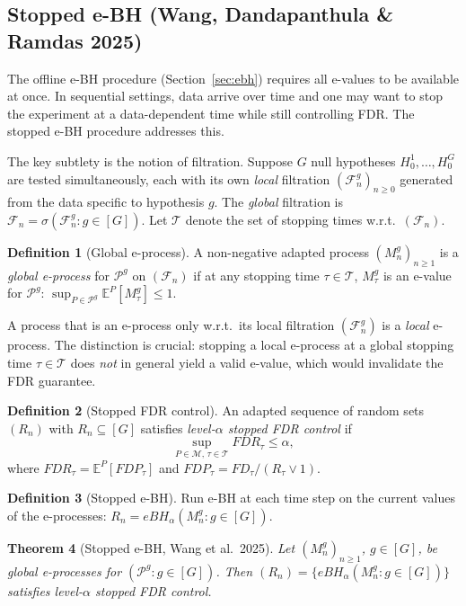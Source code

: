 \documentclass[11pt,a4paper,twocolumn]{article}
\theoremstyle{plain}
\newtheorem{theorem}{Theorem}[section]
\theoremstyle{definition}
\newtheorem{definition}[theorem]{Definition}
\theoremstyle{remark}
\newcommand{\E}{\mathbb{E}}
\begin{document}
\subsection{Stopped e-BH (Wang, Dandapanthula \& Ramdas 2025)}
\label{sec:stopped}

The offline e-BH procedure (Section~\ref{sec:ebh}) requires all e-values to
be available at once. In sequential settings, data arrive over time and one
may want to stop the experiment at a data-dependent time while still
controlling FDR. The stopped e-BH procedure addresses this.

The key subtlety is the notion of filtration. Suppose $G$ null hypotheses
$H_0^1, \ldots, H_0^G$ are tested simultaneously, each with its own
\emph{local} filtration $(\mathcal{F}_n^g)_{n \geq 0}$ generated from the
data specific to hypothesis $g$. The \emph{global} filtration is
$\mathcal{F}_n = \sigma(\mathcal{F}_n^g : g \in [G])$. Let $\mathcal{T}$
denote the set of stopping times w.r.t.\ $(\mathcal{F}_n)$.

\begin{definition}[Global e-process]
A non-negative adapted process $(M_n^g)_{n \geq 1}$ is a \emph{global
e-process} for $\mathcal{P}^g$ on $(\mathcal{F}_n)$ if at any stopping time
$\tau \in \mathcal{T}$, $M_\tau^g$ is an e-value for $\mathcal{P}^g$:
$\sup_{P \in \mathcal{P}^g} \E^P[M_\tau^g] \leq 1$.
\end{definition}

A process that is an e-process only w.r.t.\ its local filtration
$(\mathcal{F}_n^g)$ is a \emph{local} e-process. The distinction is crucial:
stopping a local e-process at a global stopping time $\tau \in \mathcal{T}$
does \emph{not} in general yield a valid e-value, which would invalidate the
FDR guarantee.

\begin{definition}[Stopped FDR control]
An adapted sequence of random sets $(R_n)$ with $R_n \subseteq [G]$
satisfies \emph{level-$\alpha$ stopped FDR control} if
\[
  \sup_{P \in \mathcal{M},\, \tau \in \mathcal{T}} FDR_\tau \leq \alpha,
\]
where $FDR_\tau = \E^P[FDP_\tau]$ and $FDP_\tau = FD_\tau / (R_\tau \vee 1)$.
\end{definition}

\begin{definition}[Stopped e-BH]
Run e-BH at each time step on the current values of the e-processes:
$R_n = eBH_\alpha(M_n^g : g \in [G])$.
\end{definition}

\begin{theorem}[Stopped e-BH, Wang et al.\ 2025]\label{thm:stopped}
Let $(M_n^g)_{n \geq 1}$, $g \in [G]$, be global e-processes for
$(\mathcal{P}^g : g \in [G])$. Then $(R_n) = \{eBH_\alpha(M_n^g : g \in [G])\}$
satisfies level-$\alpha$ stopped FDR control.
\end{theorem}
\end{document}
